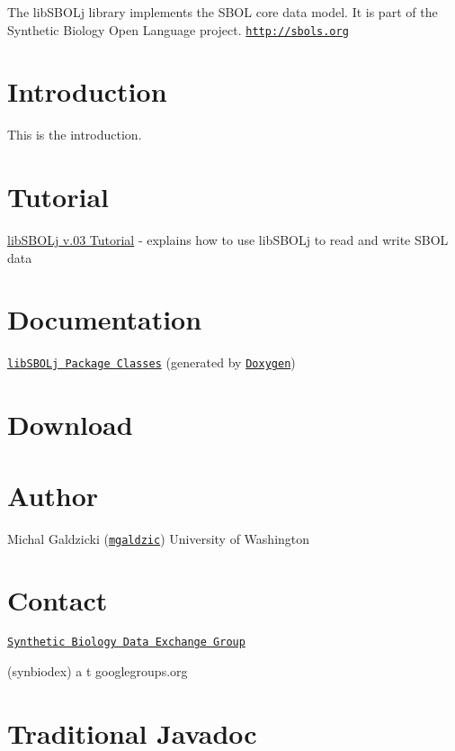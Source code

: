 The libSBOLj library implements the SBOL core data model. It is part of the Synthetic Biology Open Language project. \href{http://sbols.org}{\tt http://sbols.org} \hypertarget{index_intro}{}\section{Introduction}\label{index_intro}
This is the introduction.\hypertarget{index_tutorial_sec}{}\section{Tutorial}\label{index_tutorial_sec}

\begin{DoxyItemize}
\item \hyperlink{tutorial}{libSBOLj v.03 Tutorial} -\/ explains how to use libSBOLj to read and write SBOL data
\end{DoxyItemize}\hypertarget{index_doc_sec}{}\section{Documentation}\label{index_doc_sec}

\begin{DoxyItemize}
\item \href{annotated.html}{\tt libSBOLj Package Classes} (generated by \href{http://www.stack.nl/~dimitri/doxygen/}{\tt Doxygen})
\end{DoxyItemize}\hypertarget{index_download_sec}{}\section{Download}\label{index_download_sec}
\hypertarget{index_author_sec}{}\section{Author}\label{index_author_sec}

\begin{DoxyItemize}
\item Michal Galdzicki (\href{http://github.com/mgaldzic}{\tt mgaldzic}) University of Washington
\end{DoxyItemize}\hypertarget{index_contact_sec}{}\section{Contact}\label{index_contact_sec}

\begin{DoxyItemize}
\item \href{http://groups.google.com/group/synbiodex/}{\tt Synthetic Biology Data Exchange Group} 
\begin{DoxyPre}(synbiodex) a t googlegroups.org \end{DoxyPre}

\end{DoxyItemize}\hypertarget{index_javadoc_old}{}\section{Traditional Javadoc}\label{index_javadoc_old}

